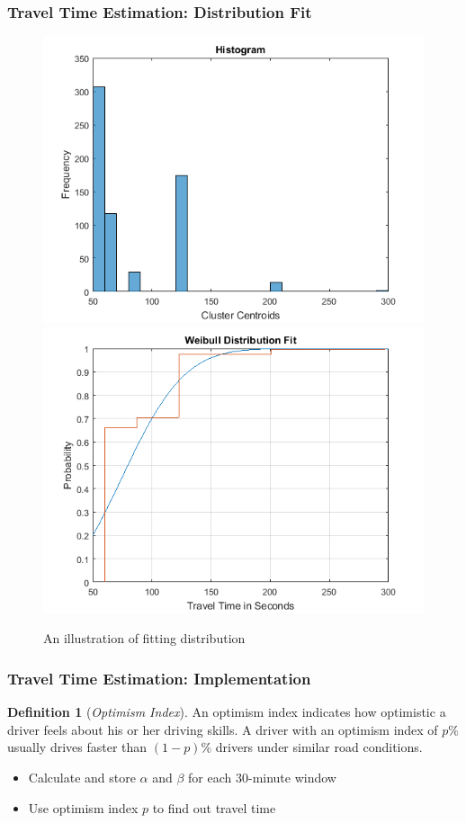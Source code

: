 \documentclass{beamer}
\theoremstyle{definition}
\newtheorem{defn}{Definition}
\begin{document}
\begin{frame}
\frametitle{Travel Time Estimation: Distribution Fit}
\begin{figure}[h!]
\centering
\includegraphics[scale = 0.4]{clus_histo}
\includegraphics[scale = 0.4]{weibull_fit}
\caption{An illustration of fitting distribution} 
\end{figure}
\end{frame}

\begin{frame}
\frametitle{Travel Time Estimation: Implementation}
\begin{defn}[\emph{Optimism Index}]\label{Def:opti_index}
An optimism index indicates how optimistic a driver feels about his or her driving skills. A driver with an optimism index of $p\%$ usually drives faster than $(1 - p)\%$ drivers under similar road conditions.
\end{defn}
\begin{itemize}
	\item <2-> Calculate and store $\alpha$ and $\beta$ for each 30-minute window
	\item <3-> Use optimism index $p$ to find out travel time
\end{itemize}
\end{frame}
\end{document}
